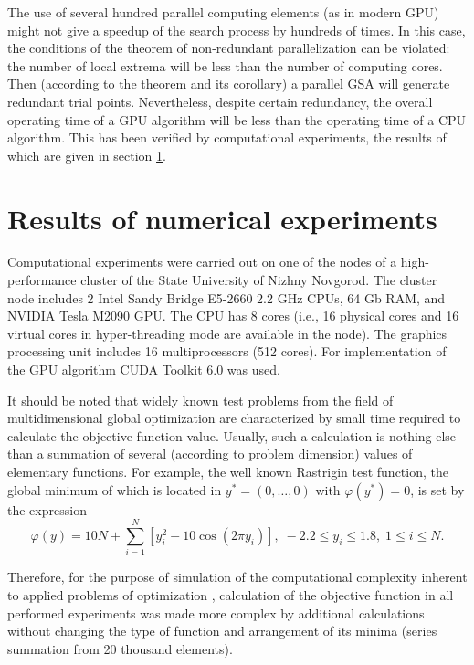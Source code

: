\documentclass[smallcondensed]{svjour3}     %
\begin{document}
The use of several hundred parallel computing elements (as in modern GPU) might not give a speedup of the search process by hundreds of times. In this case, the conditions of the theorem of non-redundant parallelization can be violated: the number of local extrema will be less than the number of computing cores. Then (according to the theorem and its corollary) a parallel GSA will generate redundant trial points. Nevertheless, despite certain redundancy, the overall operating time of a GPU algorithm will be less than the operating time of a CPU algorithm. This has been verified by computational experiments, the results of which are given in section \ref{sec:6}.

\section{Results of numerical experiments} \label{sec:6}

Computational experiments were carried out on one of the nodes of a high-performance cluster of the State University of Nizhny Novgorod. The cluster node includes 2 Intel Sandy Bridge E5-2660 2.2 GHz CPUs, 64 Gb RAM, and NVIDIA Tesla M2090 GPU. The CPU has 8 cores (i.e., 16 physical cores and 16 virtual cores in hyper-threading mode are available in the node). The graphics processing unit includes 16 multiprocessors (512 cores). For implementation of the GPU algorithm CUDA Toolkit 6.0 was used.

It should be noted that widely known test problems from the field of multidimensional global optimization are characterized by small time required to calculate the objective function value. Usually, such a calculation is nothing else than a summation of several (according to problem dimension) values of elementary functions. For example, the well known Rastrigin test function, the global minimum of which is located in $y^\ast = (0,\dots,0)$ with $\varphi(y^\ast)=0$, is set by the expression
\begin{equation}\label{eq:33}
\varphi(y)=10N+\sum^{N}_{i=1}\left[y^2_i-10\cos(2\pi y_i)\right], \; -2.2\leq y_i \leq 1.8, \; 1\leq i \leq N.
\end{equation}

Therefore, for the purpose of simulation of the computational complexity inherent to applied problems of optimization \cite{RefBarkalov2013}, calculation of the objective function in all performed experiments was made more complex by additional calculations without changing the type of function and arrangement of its minima (series summation from 20 thousand elements).
\end{document}
